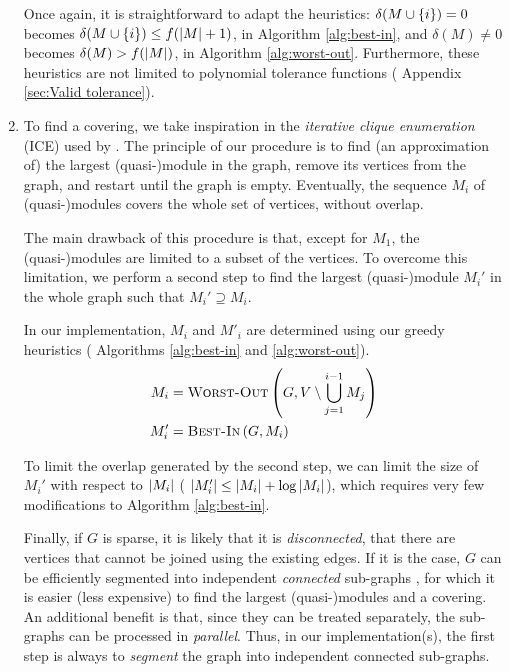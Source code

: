 \documentclass[a4paper, 12pt]{article}
\begin{document}
\begin{enumerate}[leftmargin=*]
        Once again, it is straightforward to adapt the heuristics: $\delta(M \cup \left\{i\right\}) = 0$ becomes $\delta(M \cup \left\{i\right\}) \leq f(\left|M\right| + 1)$, in Algorithm \ref{alg:best-in}, and $\delta(M) \neq 0$ becomes $\delta(M) > f(\left|M\right|)$, in Algorithm \ref{alg:worst-out}. Furthermore, these heuristics are not limited to polynomial tolerance functions (\cf{} Appendix \ref{sec:Valid tolerance}).
        
        \item To find a covering, we take inspiration in the \emph{iterative clique enumeration} (ICE) used by \textcite{shi2010co}. The principle of our procedure is to find (an approximation of) the largest (quasi-)module in the graph, remove its vertices from the graph, and restart until the graph is empty. Eventually, the sequence $M_i$ of (quasi-)modules covers the whole set of vertices, without overlap.
        
        The main drawback of this procedure is that, except for $M_1$, the (quasi-)modules are limited to a subset of the vertices. To overcome this limitation, we perform a second step to find the largest (quasi-)module $M_i'$ in the whole graph such that $M_i' \supseteq M_i$.
        
        In our implementation, $M_i$ and $M'_i$ are determined using our greedy heuristics (\cf{} Algorithms \ref{alg:best-in} and \ref{alg:worst-out}).
        \begin{align}
            M_i & = \textsc{Worst-Out}\left(G, V \setminus \bigcup_{j = 1}^{i - 1} M_j\right) \\
            M_i' & = \textsc{Best-In}\left(G, M_i\right)
        \end{align}
        
        To limit the overlap generated by the second step, we can limit the size of $M_i'$ with respect to $\left|M_i\right|$ (\eg{} $\left|M_i'\right| \leq \left|M_i\right| + \log \left|M_i\right|$), which requires very few modifications to Algorithm \ref{alg:best-in}.
        
        Finally, if $G$ is sparse, it is likely that it is \emph{disconnected}, \ie{} that there are vertices that cannot be joined using the existing edges. If it is the case, $G$ can be efficiently segmented into independent \emph{connected} sub-graphs \cite{wiki2020connectivity}, for which it is easier (less expensive) to find the largest (quasi-)modules and a covering. An additional benefit is that, since they can be treated separately, the sub-graphs can be processed in \emph{parallel}. Thus, in our implementation(s), the first step is always to \emph{segment} the graph into independent connected sub-graphs.
    \end{enumerate}
    
\end{document}
